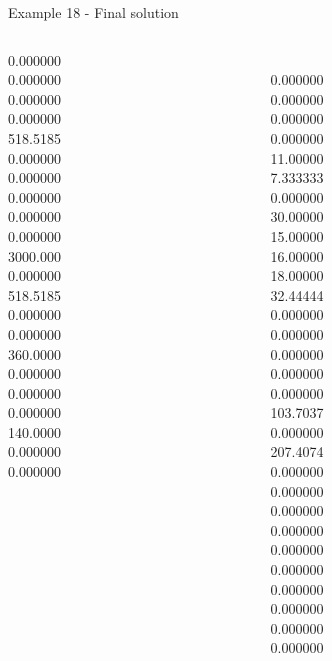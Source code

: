 \begin{frame}{Example 18 - Final solution}
\begin{columns}[t]
\begin{column}{0.3\textwidth}
0.000000\\
0.000000\\
0.000000\\
0.000000\\
518.5185\\
0.000000\\
0.000000\\
0.000000\\
0.000000\\
0.000000\\
3000.000\\
0.000000\\
518.5185\\
0.000000\\
0.000000\\
360.0000\\
0.000000\\
0.000000\\
0.000000\\
140.0000\\
0.000000\\
0.000000\\

\end{column}  

\begin{column}{0.3\textwidth}
\\
0.000000\\
0.000000\\
0.000000\\
0.000000\\
11.00000\\
7.333333\\
0.000000\\
30.00000\\
15.00000\\
16.00000\\
18.00000\\
32.44444\\
0.000000\\
0.000000\\
0.000000\\
0.000000\\
0.000000\\
103.7037\\
0.000000\\
207.4074\\
0.000000\\
0.000000\\
0.000000\\
0.000000\\
0.000000\\
0.000000\\
0.000000\\
0.000000\\
0.000000\\
0.000000\\


\end{column}
\end{columns}
\end{frame}

